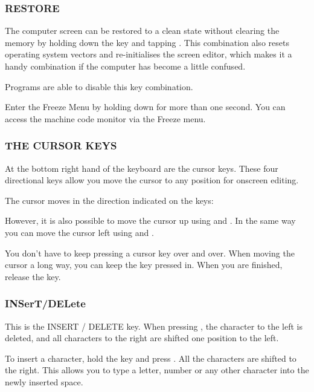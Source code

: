 \subsubsection{RESTORE}

The computer screen can be restored to a clean state without clearing the memory by holding down the  key and tapping . This combination also resets operating system vectors and re-initialises the screen editor, which makes it a handy combination if the computer has become a little confused.

Programs are able to disable this key combination.

Enter the Freeze Menu by holding down  for more than one second. You can access the machine code monitor via the Freeze menu.

\newpage

\subsubsection{THE CURSOR KEYS}

At the bottom right hand of the keyboard are the cursor keys. These four directional keys allow you move the cursor to any position for onscreen editing.

The cursor moves in the direction indicated on the keys: \megakey{$\leftarrow$} \megakey{$\uparrow$} \megakey{$\rightarrow$} \megakey{$\downarrow$}

However, it is also possible to move the cursor up using  and \megakey{$\downarrow$}. In the same way you can move the cursor left using  and \megakey{$\rightarrow$}.

You don't have to keep pressing a cursor key over and over. When moving the cursor a long way, you can keep the key pressed in. When you are finished, release the key.

\subsubsection{INSerT/DELete}

This is the INSERT / DELETE key. When pressing , the character to the left is deleted, and all characters to the right are shifted one position to the left.

To insert a character, hold the  key and press . All the characters are shifted to the right. This allows you to type a letter, number or any other character into the newly inserted space.


